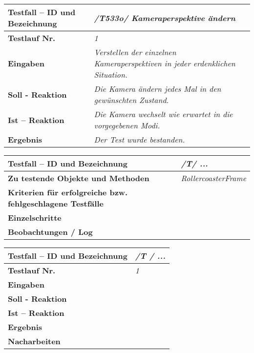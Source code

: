 \begin{longtable}{|p{7cm}|p{10cm}|}
\hline
\textbf{Testfall -- ID und Bezeichnung} & \textit{/T533o/ Kameraperspektive ändern} \\
\hline
\textbf{Testlauf Nr.} & \textit{1} \\
\hline
\textbf{Eingaben} & \textit{Verstellen der einzelnen Kameraperspektiven in jeder erdenklichen Situation.} \\
\hline
\textbf{Soll - Reaktion} & \textit{Die Kamera ändern jedes Mal in den gewünschten Zustand.} \\
\hline
\textbf{Ist -- Reaktion} & \textit{Die Kamera wechselt wie erwartet in die vorgegebenen Modi.} \\
\hline
\textbf{Ergebnis} & \textit{Der Test wurde bestanden.} \\
\hline
\end{longtable}

\begin{longtable}{|p{7cm}|p{10cm}|}
\hline
\textbf{Testfall -- ID und Bezeichnung} &  \textit{/T/ ...} \\
\hline
\textbf{Zu testende Objekte und Methoden} &  \textit{RollercoasterFrame}
\\
\hline
\textbf{Kriterien für erfolgreiche bzw. fehlgeschlagene Testfälle} &
\textit{} \\
\hline
\textbf{Einzelschritte} &  \textit{} \\
\hline
\textbf{Beobachtungen / Log} &  \textit{} \\
\hline
\end{longtable}

\begin{longtable}{|p{7cm}|p{10cm}|}
\hline
\textbf{Testfall -- ID und Bezeichnung} & \textit{ /T / ...} \\
\hline
\textbf{Testlauf Nr.} & \textit{1} \\
\hline
\textbf{Eingaben} & \textit{} \\
\hline
\textbf{Soll - Reaktion} & \textit{} \\
\hline
\textbf{Ist -- Reaktion} & \textit{} \\
\hline
\textbf{Ergebnis} & \textit{} \\
\hline
\textbf{Nacharbeiten } & \textit{} \\
\hline
\end{longtable}


